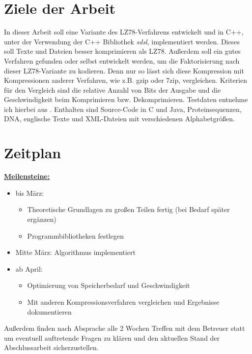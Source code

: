 \documentclass[a4paper,11pt]{scrartcl}%
\theoremstyle{nonumberplain}
\theoremstyle{change}
\theoremstyle{nonumberplain}
\theoremstyle{change}
\theoremstyle{nonumberplain}
\begin{document}
	
	\section{Ziele der Arbeit}
	
	In dieser Arbeit soll eine Variante des LZ78-Verfahrens entwickelt und in C++, unter der Verwendung der C++ Bibliothek \textit{sdsl}, implementiert werden. Dieses soll Texte und Dateien besser komprimieren als LZ78. Außerdem soll ein gutes Verfahren gefunden oder selbst entwickelt werden, um die Faktorisierung nach dieser LZ78-Variante zu kodieren. Denn nur so lässt sich diese Kompression mit Kompressionen anderer Verfahren, wie z.B. gzip oder 7zip, vergleichen. Kriterien für den Vergleich sind die relative Anzahl von Bits der Ausgabe und die Geschwindigkeit beim Komprimieren bzw. Dekomprimieren. Testdaten entnehme ich hierbei aus \cite{textcollection}. Enthalten sind Source-Code in C und Java, Proteinsequenzen, DNA, englische Texte und XML-Dateien mit verschiedenen Alphabetgrößen. 
	\newpage
	\section{Zeitplan}
	\textbf{\underline{Meilensteine:}}
	\begin{itemize}
		\item bis März: \begin{itemize}
		\item Theoretische Grundlagen zu großen Teilen fertig (bei Bedarf später ergänzen)
		\item Programmbibliotheken festlegen
		\end{itemize}
			\item Mitte März: Algorithmus implementiert
			\item ab April: 
		\begin{itemize}
			\item Optimierung von Speicherbedarf und Geschwindigkeit
			\item Mit anderen Kompressionsverfahren vergleichen und Ergebnisse dokumentieren
		\end{itemize}
	\end{itemize}	
	Außerdem finden nach Absprache alle 2 Wochen Treffen mit dem Betreuer statt um eventuell auftretende Fragen zu klären und den aktuellen Stand der Abschlussarbeit sicherzustellen.
	
	
	
	\newpage
	\nocite{*}
	

	
	
\end{document}

